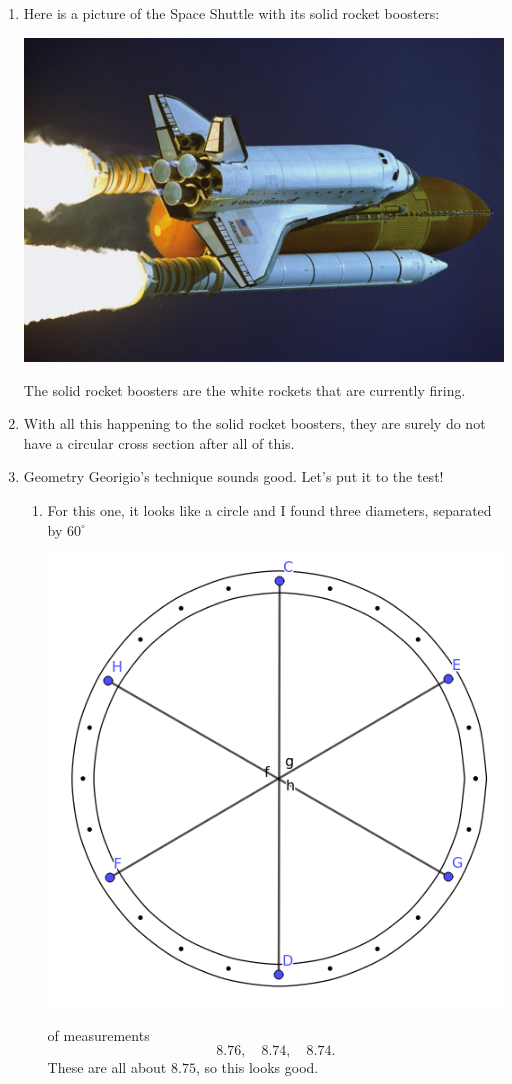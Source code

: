 \documentclass[nooutcomes,noauthor,hints,handout]{ximera}
\begin{document}
\begin{question}
  \begin{freeResponse}
    \begin{enumerate}
    \item Here is a picture of the Space Shuttle with its solid rocket boosters:
      \begin{center}
        \includegraphics[width=.4\textwidth]{shuttleWithSRB.jpg}
      \end{center}
      The solid rocket boosters are the white rockets that are currently firing.
    \item With all this happening to the solid rocket boosters, they
      are surely do not have a circular cross section after all of
      this.
    \item Geometry Georigio's technique sounds good. Let's put it to the test!
      \begin{enumerate}
      \item For this one, it looks like a circle and I found three
        diameters, separated by $60^\circ$
        \begin{center}
          \includegraphics[width=.4\textwidth]{circleGGMeasured.png}
        \end{center}
        of measurements
        \[
        8.76,\quad 8.74,\quad 8.74.
        \]
        These are all about $8.75$, so this looks good.


\end{enumerate}
\end{enumerate}
\end{freeResponse}
\end{question}
\end{document}
